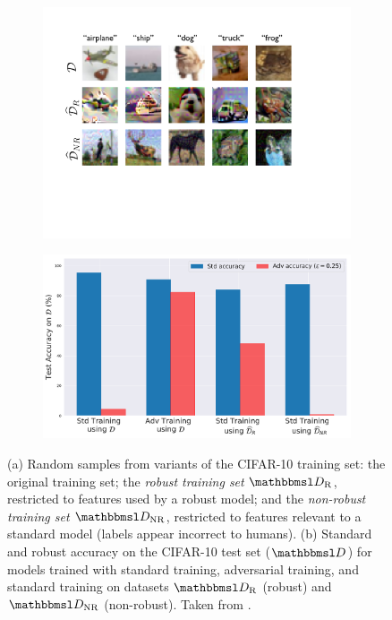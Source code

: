 \documentclass[twocolumn]{article}
\begin{document}
\begin{figure}
	\centering
	\begin{subfigure}[b]{0.45\textwidth}
		\centering
		\includegraphics[width=1.0\textwidth]{figures/adversarial-examples/ilyas/cifar_datasets.pdf}
		\vfill\null
		\caption{}
		\label{fig:robust_inputs}
	\end{subfigure}
	\hfill
	\begin{subfigure}[b]{0.5\textwidth}
		\centering
		\includegraphics[width=\textwidth]{figures/adversarial-examples/ilyas/CIFAR_res.pdf}
		\caption{}
		\label{fig:robustify_cifar}
	\end{subfigure}
	\caption{
		(a) Random samples from variants of the
		CIFAR-10 training set:
		the original training set; 
		the \textit{robust training set} $\set D_\text{R}$, restricted to features used by a
		robust model; and
		the \textit{non-robust training set} $\set D_\text{NR}$, restricted to
		features relevant to a standard model (labels appear incorrect to humans).
		(b) Standard and robust accuracy on the CIFAR-10
		test set ($\set D$) for models trained with standard training, adversarial training, and standard training on datasets $\set D_\text{R}$ (robust) and $\set D_\text{NR}$ (non-robust). Taken from \citet{Ilyas:2019:AENBTF}.}
	\label{fig:iliyas-experiment-results}
\end{figure}
\end{document}
